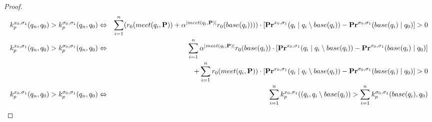 \begin{proof}
\begin{eqnarray*}
		k^{x_0,\sigma_1}_p(q_n,q_0) > k^{\sigma_0,\sigma_1}_p(q_n,q_0) & \Leftrightarrow & \sum_{i = 1}^{n} (r_0(meet(q_i,\mathbf{P}))+\alpha^{|meet(q_i,\mathbf{P})|}r_0(base(q_i)))) \cdot [\mathbf{Pr}^{x_0,\sigma_1}(q_i \mid q_i \setminus base(q_i)) -  \mathbf{Pr}^{\sigma_0,\sigma_1}(base(q_i) \mid q_0)] > 0\\
		k^{x_0,\sigma_1}_p(q_n,q_0) > k^{\sigma_0,\sigma_1}_p(q_n,q_0) & \Leftrightarrow & \sum_{i = 1}^{n} \alpha^{|meet(q_i,\mathbf{P})|}r_0(base(q_i)) \cdot [\mathbf{Pr}^{x_0,\sigma_1}(q_i \mid q_i \setminus base(q_i)) -  \mathbf{Pr}^{\sigma_0,\sigma_1}(base(q_i) \mid q_0)]  \\
		&& + \sum_{i = 1}^{n} r_0(meet(q_i,\mathbf{P})) \cdot [\mathbf{Pr}^{x_0,\sigma_1}(q_i \mid q_i \setminus base(q_i)) -  \mathbf{Pr}^{\sigma_0,\sigma_1}(base(q_i) \mid q_0)] > 0\\
		k^{x_0,\sigma_1}_p(q_n,q_0) > k^{\sigma_0,\sigma_1}_p(q_n,q_0) & \Leftrightarrow & \sum_{i = 1}^{n} k^{x_0,\sigma_1}_p((q_i , q_i \setminus base(q_i)) >\sum_{i = 1}^{n} k^{\sigma_0,\sigma_1}_p(base(q_i),q_0) \\
	\end{eqnarray*}
\fi

	
\end{proof}
